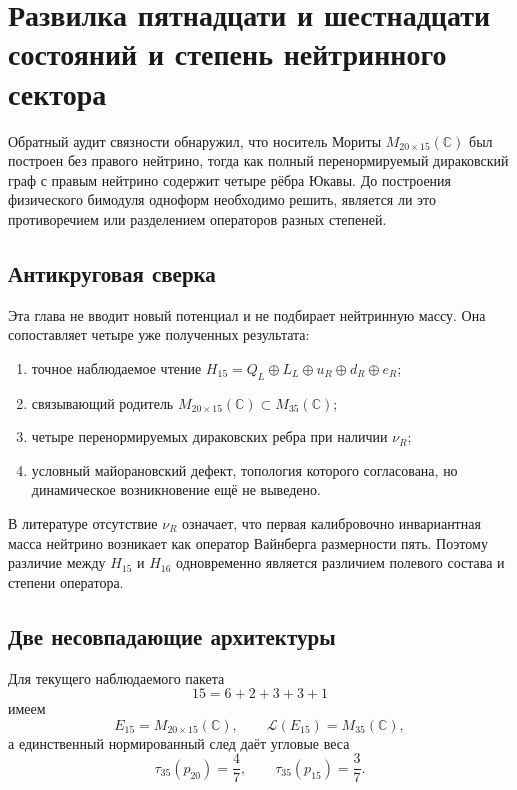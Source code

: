 \chapter{Развилка пятнадцати и шестнадцати состояний и степень нейтринного сектора}

Обратный аудит связности обнаружил, что носитель Мориты
$M_{20\times15}(\mathbb C)$ был построен без правого нейтрино, тогда как
полный перенормируемый дираковский граф с правым нейтрино содержит четыре
рёбра Юкавы. До построения физического бимодуля одноформ необходимо решить,
является ли это противоречием или разделением операторов разных степеней.

\section{Антикруговая сверка}

Эта глава не вводит новый потенциал и не подбирает нейтринную массу. Она
сопоставляет четыре уже полученных результата:
\begin{enumerate}
 \item точное наблюдаемое чтение
 $H_{15}=Q_L\oplus L_L\oplus u_R\oplus d_R\oplus e_R$;
 \item связывающий родитель
 $M_{20\times15}(\mathbb C)\subset M_{35}(\mathbb C)$;
 \item четыре перенормируемых дираковских ребра при наличии $\nu_R$;
 \item условный майорановский дефект, топология которого согласована, но
 динамическое возникновение ещё не выведено.
\end{enumerate}
В литературе отсутствие $\nu_R$ означает, что первая калибровочно
инвариантная масса нейтрино возникает как оператор Вайнберга размерности
пять. Поэтому различие между $H_{15}$ и $H_{16}$ одновременно является
различием полевого состава и степени оператора.

\section{Две несовпадающие архитектуры}

Для текущего наблюдаемого пакета
\begin{equation}
 15=6+2+3+3+1
\end{equation}
имеем
\begin{equation}
 E_{15}=M_{20\times15}(\mathbb C),\qquad
 \mathcal L(E_{15})=M_{35}(\mathbb C),
\end{equation}
а единственный нормированный след даёт угловые веса
\begin{equation}
 \tau_{35}(p_{20})=\frac47,
 \qquad
 \tau_{35}(p_{15})=\frac37.
\end{equation}

